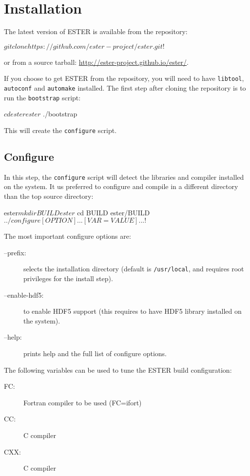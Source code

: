 \pagebreak

\section{Installation}
The latest version of ESTER is available from the \git repository:
\begin{shell}
    $ git clone https://github.com/ester-project/ester.git
    !$
\end{shell}
or from a source tarball: \url{http://ester-project.github.io/ester/}.

If you choose to get ESTER from the \git repository, you will need to have
\texttt{libtool}, \texttt{autoconf} and \texttt{automake} installed.
The first step after cloning the repository is to run the \texttt{bootstrap}
script:
\begin{shell}
    $ cd ester
    ester$ ./bootstrap
\end{shell}
This will create the \texttt{configure} script.

\subsection{Configure}
In this step, the \texttt{configure} script will detect the libraries and
compiler installed on the system.
It us preferred to configure and compile in a different directory than the top
source directory:
\begin{shell}
    ester$ mkdir BUILD
    ester$ cd BUILD
    ester/BUILD$ ../configure [OPTION]... [VAR=VALUE]...
    !$
\end{shell}

The most important configure options are:
\begin{description}
    \item[--prefix:] selects the installation directory (default is
        \texttt{/usr/local}, and requires root privileges for the install step).
    \item[--enable-hdf5:] to enable HDF5 support (this requires to have HDF5
        library installed on the system).
    \item[--help:] prints help and the full list of configure options.
\end{description}
The following variables can be used to tune the ESTER build configuration:
\begin{description}
    \item[FC:] Fortran compiler to be used (\eg FC=ifort)
    \item[CC:] C compiler
    \item[CXX:] C compiler
\end{description}

